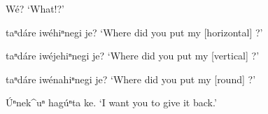 \documentclass[output=paper]{LSP/langsci}
\begin{document}
\begin{list}{}{}
\item{Wé? `What!?'}
\item{\underline{\hspace{1em}} taⁿdáre iwéhiⁿnegi  je? `Where did you put my [horizontal] \underline{\hspace{1em}}?'}
\item{\underline{\hspace{1em}} taⁿdáre iwéjehiⁿnegi je? `Where did you put my [vertical] \underline{\hspace{1em}}?'}
\item{\underline{\hspace{1em}} taⁿdáre iwénahiⁿnegi je? `Where did you put my [round] \underline{\hspace{1em}}?'}
\item{\'Uⁿnek\^{ }uⁿ hagúⁿta ke. `I want you to give it back.'}
\end{list} 
\end{document}
